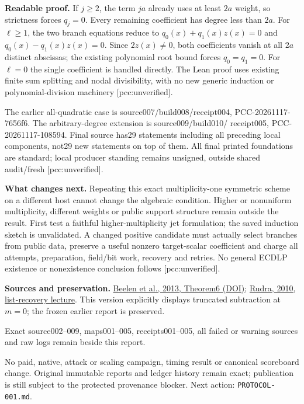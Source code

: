 \documentclass[10pt]{article}
\begin{document}
\textbf{Readable proof.} If $j\ge2$, the term $ja$ already uses at least
$2a$ weight, so strictness forces $q_j=0$. Every remaining coefficient has
degree less than $2a$. For $\ell\ge1$, the two branch equations reduce to
$q_0(x)+q_1(x)z(x)=0$ and $q_0(x)-q_1(x)z(x)=0$.
Since $2z(x)\ne0$, both coefficients vanish at all $2a$ distinct abscissas;
the existing polynomial root bound forces $q_0=q_1=0$. For $\ell=0$ the
single coefficient is handled directly. The Lean proof uses existing finite
sum splitting and nodal divisibility, with no new generic induction or
polynomial-division machinery [pcc:unverified].

The earlier all-quadratic case is source007/build008/receipt004,
PCC-20261117-7656f6. The arbitrary-degree extension is source009/build010/
receipt005, PCC-20261117-108594. Final source has29 statements including all
preceding local components, not29 new statements on top of them. All final
printed foundations are standard; local producer standing remains unsigned,
outside shared audit/fresh [pcc:unverified].

\textbf{What changes next.} Repeating this exact multiplicity-one symmetric
scheme on a different host cannot change the algebraic condition.
Higher or nonuniform multiplicity, different weights or public support
structure remain outside the result. First test a faithful higher-multiplicity
jet formulation; the saved induction sketch is unvalidated. A changed positive
candidate must actually select branches from public data, preserve a useful
nonzero target-scalar coefficient and charge all attempts, preparation,
field/bit work, recovery and retries. No general ECDLP existence or
nonexistence conclusion follows [pcc:unverified].

\textbf{Sources and preservation.}
\href{https://doi.org/10.1109/TIT.2013.2243800}{Beelen et al., 2013, Theorem6 (DOI)};
\href{https://cse.buffalo.edu/faculty/atri/courses/coding-theory/spr10/lectures/lect39.pdf}{Rudra, 2010, list-recovery lecture}.
This version explicitly displays truncated subtraction at $m=0$; the frozen earlier report is preserved.

Exact source002--009, maps001--005, receipts001--005, all failed or warning
sources and raw logs remain beside this report.

No paid, native, attack or scaling
campaign, timing result or canonical scoreboard change. Original immutable
reports and ledger history remain exact; publication is still subject to the
protected provenance blocker. Next action: \texttt{PROTOCOL-001.md}.
\end{document}
